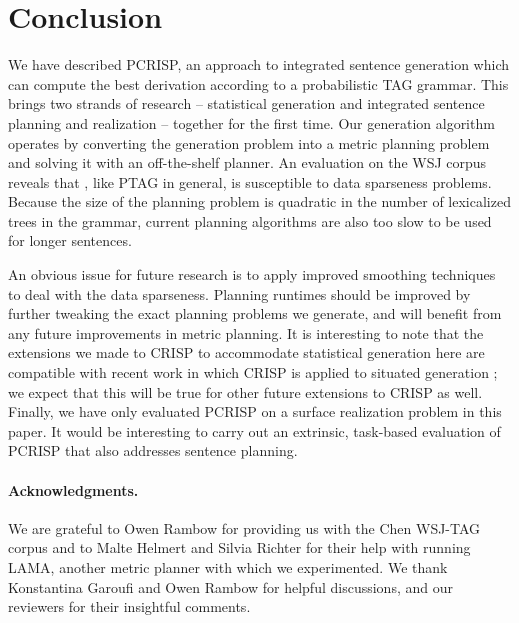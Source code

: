 \section{Conclusion}
\label{sec:conclusion}

We have described PCRISP, an approach to integrated sentence generation which can compute the best derivation according to a probabilistic TAG grammar.  This brings two strands of research -- statistical generation and integrated sentence planning and realization -- together for the first time.  Our generation algorithm operates by converting the generation problem into a metric planning problem and solving it with an off-the-shelf planner.  An evaluation on the WSJ corpus reveals that \pcrisp, like PTAG in general, is susceptible to data sparseness problems.  Because the size of the planning problem is quadratic in the number of lexicalized trees in the grammar, current planning algorithms are also too slow to be used for longer sentences.

An obvious issue for future research is to apply improved smoothing techniques to deal with the data sparseness.  Planning runtimes should be improved by further tweaking the exact planning problems we generate, and will benefit from any future improvements in metric planning.  It is interesting to note that the extensions we made to CRISP to accommodate statistical generation here are compatible with recent work in which CRISP is applied to situated generation \cite{garoufikoller2010}; we expect that this will be true for other future extensions to CRISP as well.  Finally, we have only evaluated PCRISP on a surface realization problem in this paper.  It would be interesting to carry out an extrinsic, task-based evaluation of PCRISP that also addresses sentence planning.

\paragraph{Acknowledgments.} We are grateful to Owen Rambow for providing us with the Chen WSJ-TAG corpus and to Malte Helmert and Silvia Richter for their help with running LAMA, another metric planner with which we experimented. We thank Konstantina Garoufi and Owen Rambow for helpful discussions, and our reviewers for their insightful comments.






